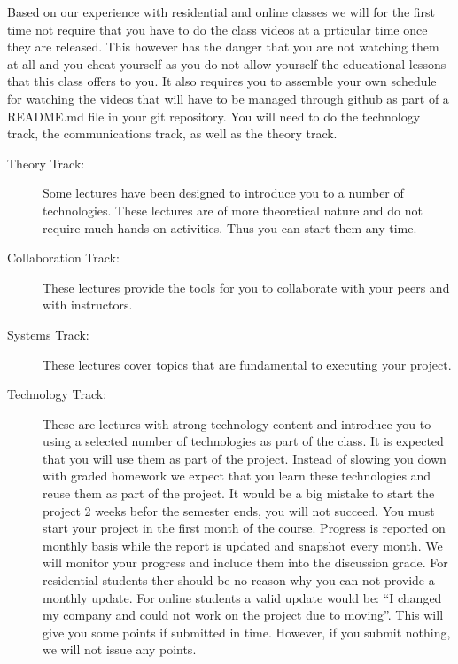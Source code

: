 Based on our experience with residential and online classes we will
for the first time not require that you have to do the class videos at
a prticular time once they are released. This however has the danger
that you are not watching them at all and you cheat yourself as you do
not allow yourself the educational lessons that this class offers to
you. It also requires you to assemble your own schedule for watching
the videos that will have to be managed through github as part of a
README.md file in your git repository. You will need to do the
technology track, the communications track, as well as the theory
track.
\begin{description}
\item[{Theory Track:}] \leavevmode
Some lectures have been designed to introduce you to a
number of technologies. These lectures are of more theoretical
nature and do not require much hands on activities. Thus you can
start them any time.

\item[{Collaboration Track:}] \leavevmode
These lectures provide the tools for you to collaborate with your
peers and with instructors.

\item[{Systems Track:}] \leavevmode
These lectures cover topics that are fundamental to executing your
project.

\item[{Technology Track:}] \leavevmode
These are lectures with strong technology content and
introduce you to using a selected number of technologies as part of
the class. It is expected that you will use them as part of the
project. Instead of slowing you down with graded homework we expect
that you learn these technologies and reuse them as part of the
project. It would be a big mistake to start the project 2 weeks
befor the semester ends, you will not succeed. You must start your
project in the first month of the course. Progress is reported on
monthly basis while the report is updated and snapshot every
month. We will monitor your
progress and include them into the discussion grade. For
residential students ther should be no reason why you can not
provide a monthly update. For online students a valid update would
be: ``I changed my company and could not work on the project due to
moving''. This will give you some points if submitted in
time. However, if you submit nothing, we will not issue any points.

\end{description}


